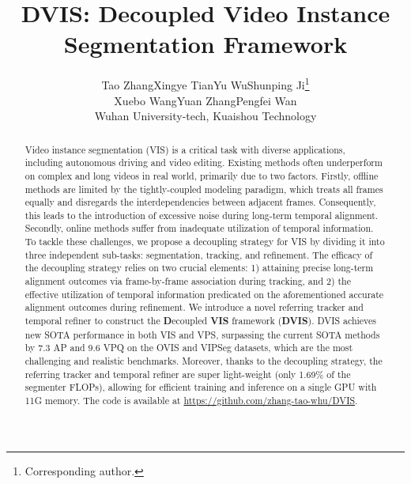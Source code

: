 \documentclass[10pt,twocolumn,letterpaper]{article}
\begin{document}
\title{DVIS: Decoupled Video Instance Segmentation Framework}

\author{Tao Zhang{\qquad}Xingye Tian{\qquad}Yu Wu{\qquad}Shunping Ji\thanks{ Corresponding author.}\\
Xuebo Wang{\qquad}Yuan Zhang{\qquad}Pengfei Wan \vspace{3mm}\\
Wuhan University\qquadY-tech, Kuaishou Technology 
}

\maketitle
\ificcvfinal\thispagestyle{empty}\fi

\begin{abstract}
Video instance segmentation (VIS) is a critical task with diverse applications, including autonomous driving and video editing. Existing methods often underperform on complex and long videos in real world, primarily due to two factors. Firstly, offline methods are limited by the tightly-coupled modeling paradigm, which treats all frames equally and disregards the interdependencies between adjacent frames. Consequently, this leads to the introduction of excessive noise during long-term temporal alignment. Secondly, online methods suffer from inadequate utilization of temporal information. To tackle these challenges, we propose a decoupling strategy for VIS by dividing it into three independent sub-tasks: segmentation, tracking, and refinement. The efficacy of the decoupling strategy relies on two crucial elements: 1) attaining precise long-term alignment outcomes via frame-by-frame association during tracking, and 2) the effective utilization of temporal information predicated on the aforementioned accurate alignment outcomes during refinement. We introduce a novel referring tracker and temporal refiner to construct the \textbf{D}ecoupled \textbf{VIS} framework (\textbf{DVIS}). DVIS achieves new SOTA performance in both VIS and VPS, surpassing the current SOTA methods by 7.3 AP and 9.6 VPQ on the OVIS and VIPSeg datasets, which are the most challenging and realistic benchmarks. Moreover, thanks to the decoupling strategy, the referring tracker and temporal refiner are super light-weight (only 1.69\% of the segmenter FLOPs), allowing for efficient training and inference on a single GPU with 11G memory. The code is available at \href{https://github.com/zhang-tao-whu/DVIS}{https://github.com/zhang-tao-whu/DVIS}.
\end{abstract}
\end{document}
